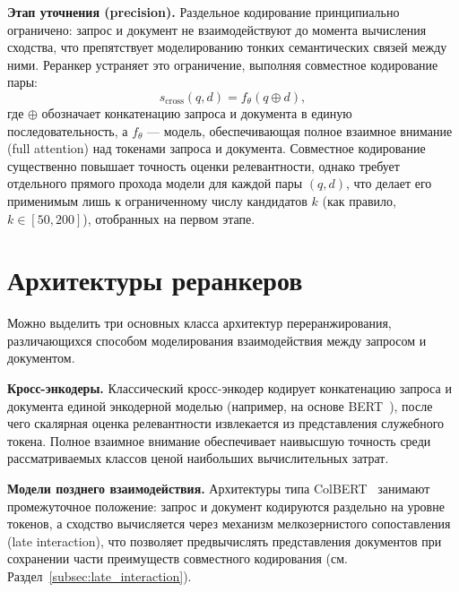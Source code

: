 \textbf{Этап уточнения (precision).} Раздельное кодирование принципиально ограничено: запрос и документ не взаимодействуют до момента вычисления сходства, что препятствует моделированию тонких семантических связей между ними.
Реранкер устраняет это ограничение, выполняя совместное кодирование пары:
\begin{equation}
\label{eq:rr_crossencoder}
    s_{\text{cross}}(q, d) = f_\theta(q \oplus d),
\end{equation}
где $\oplus$ обозначает конкатенацию запроса и документа в единую последовательность, а $f_\theta$ --- модель, обеспечивающая полное взаимное внимание (full attention) над токенами запроса и документа.
Совместное кодирование существенно повышает точность оценки релевантности, однако требует отдельного прямого прохода модели для каждой пары $(q, d)$, что делает его применимым лишь к ограниченному числу кандидатов $k$ (как правило, $k \in [50, 200]$), отобранных на первом этапе.

\section{Архитектуры реранкеров}\label{sec:rr_architectures}

Можно выделить три основных класса архитектур переранжирования, различающихся способом моделирования взаимодействия между запросом и документом.

\textbf{Кросс-энкодеры.} Классический кросс-энкодер кодирует конкатенацию запроса и документа единой энкодерной моделью (например, на основе BERT~\cite{devlin2019bert}), после чего скалярная оценка релевантности извлекается из представления служебного токена.
Полное взаимное внимание обеспечивает наивысшую точность среди рассматриваемых классов ценой наибольших вычислительных затрат.

\textbf{Модели позднего взаимодействия.} Архитектуры типа ColBERT~\cite{2004.12832} занимают промежуточное положение: запрос и документ кодируются раздельно на уровне токенов, а сходство вычисляется через механизм мелкозернистого сопоставления (late interaction), что позволяет предвычислять представления документов при сохранении части преимуществ совместного кодирования (см. Раздел~\ref{subsec:late_interaction}).

